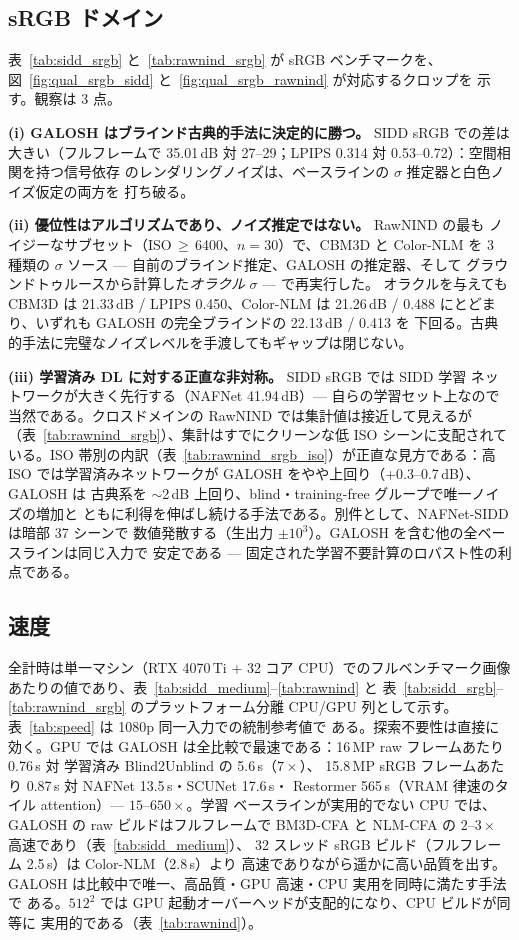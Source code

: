 \documentclass[10pt,twocolumn]{article}
\begin{document}
\subsection{sRGB ドメイン}\label{sec:srgb}
表~\ref{tab:sidd_srgb} と~\ref{tab:rawnind_srgb} が sRGB ベンチマークを、
図~\ref{fig:qual_srgb_sidd} と~\ref{fig:qual_srgb_rawnind} が対応するクロップを
示す。観察は 3 点。

\textbf{(i) GALOSH はブラインド古典的手法に決定的に勝つ。} SIDD sRGB での差は
大きい（フルフレームで 35.01\,dB 対 27--29；LPIPS 0.314 対 0.53--0.72）：空間相関を持つ信号依存
のレンダリングノイズは、ベースラインの $\sigma$ 推定器と白色ノイズ仮定の両方を
打ち破る。

\textbf{(ii) 優位性はアルゴリズムであり、ノイズ推定ではない。} RawNIND の最も
ノイジーなサブセット（ISO\,$\geq$\,6400、$n{=}30$）で、CBM3D と Color-NLM を
3 種類の $\sigma$ ソース --- 自前のブラインド推定、GALOSH の推定器、そして
グラウンドトゥルースから計算した\emph{オラクル} $\sigma$ --- で再実行した。
オラクルを与えても CBM3D は 21.33\,dB / LPIPS 0.450、Color-NLM は 21.26\,dB /
0.488 にとどまり、いずれも GALOSH の完全ブラインドの 22.13\,dB / 0.413 を
下回る。古典的手法に完璧なノイズレベルを手渡してもギャップは閉じない。

\textbf{(iii) 学習済み DL に対する正直な非対称。} SIDD sRGB では SIDD 学習
ネットワークが大きく先行する（NAFNet 41.94\,dB）--- 自らの学習セット上なので
当然である。クロスドメインの RawNIND では集計値は接近して見えるが
（表~\ref{tab:rawnind_srgb}）、集計はすでにクリーンな低 ISO シーンに支配されて
いる。ISO 帯別の内訳（表~\ref{tab:rawnind_srgb_iso}）が正直な見方である：高 ISO
では学習済みネットワークが GALOSH をやや上回り（+0.3--0.7\,dB）、GALOSH は
古典系を $\sim$2\,dB 上回り、blind・training-free グループで唯一ノイズの増加と
ともに利得を伸ばし続ける手法である。別件として、NAFNet-SIDD は暗部 37 シーンで
数値発散する（生出力 $\pm10^3$）。GALOSH を含む他の全ベースラインは同じ入力で
安定である --- 固定された学習不要計算のロバスト性の利点である。

\subsection{速度}\label{sec:speed}
全計時は単一マシン（RTX 4070\,Ti + 32 コア CPU）でのフルベンチマーク画像
あたりの値であり、表~\ref{tab:sidd_medium}--\ref{tab:rawnind} と
表~\ref{tab:sidd_srgb}--\ref{tab:rawnind_srgb} のプラットフォーム分離
CPU/GPU 列として示す。表~\ref{tab:speed} は 1080p 同一入力での統制参考値で
ある。探索不要性は直接に効く。GPU では GALOSH は全比較で最速である：16\,MP
raw フレームあたり 0.76\,s 対 学習済み Blind2Unblind の 5.6\,s（$7\times$）、
15.8\,MP sRGB フレームあたり 0.87\,s 対 NAFNet 13.5\,s・SCUNet 17.6\,s・
Restormer 565\,s（VRAM 律速のタイル attention）--- $15$--$650\times$。学習
ベースラインが実用的でない CPU では、GALOSH の raw ビルドはフルフレームで
BM3D-CFA と NLM-CFA の $2$--$3\times$ 高速であり（表~\ref{tab:sidd_medium}）、
32 スレッド sRGB ビルド（フルフレーム 2.5\,s）は Color-NLM（2.8\,s）より
高速でありながら遥かに高い品質を出す。GALOSH は比較中で唯一、高品質・GPU 高速・CPU 実用を同時に満たす手法で
ある。$512^2$ では GPU 起動オーバーヘッドが支配的になり、CPU ビルドが同等に
実用的である（表~\ref{tab:rawnind}）。
\end{document}
